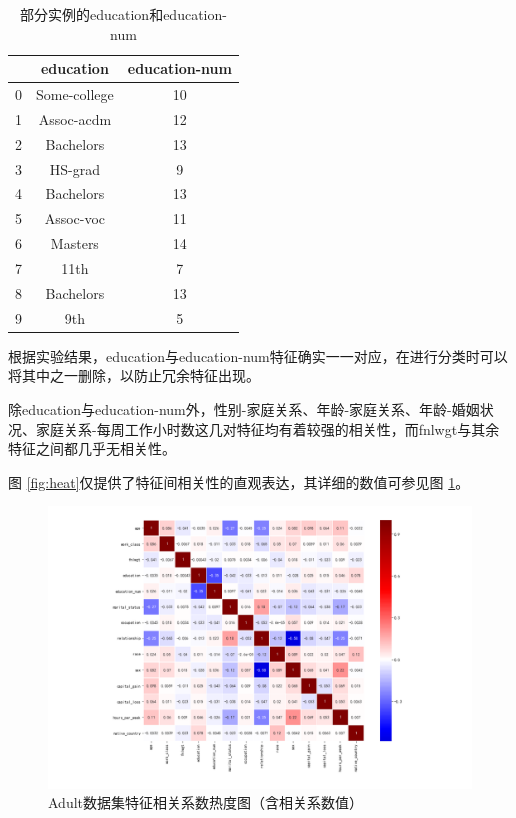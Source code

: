 \documentclass[12pt,a4paper]{article}
\theoremstyle{definition}
\begin{document}
\begin{table}[H]
	\renewcommand\arraystretch{1.35}
	\caption{部分实例的education和education-num}
	\label{tab:guess}
	\centering
	
	\begin{tabular}{c|c|c}
		\centering
		 & education & education-num \\
		\hline
		\hline
		
		0 & Some-college & 10 \\
		1 & Assoc-acdm & 12 \\
		2 & Bachelors & 13 \\
		3 & HS-grad & 9 \\
		4 & Bachelors & 13 \\
		5 & Assoc-voc & 11 \\
		6 & Masters & 14 \\
		7 & 11th & 7 \\
		8 & Bachelors & 13 \\
		9 & 9th & 5 \\

	\end{tabular}
\end{table}

根据实验结果，education与education-num特征确实一一对应，在进行分类时可以将其中之一删除，以防止冗余特征出现。

\vspace{0.01\linewidth}
除education与education-num外，性别-家庭关系、年龄-家庭关系、年龄-婚姻状况、家庭关系-每周工作小时数这几对特征均有着较强的相关性，而fnlwgt与其余特征之间都几乎无相关性。

\vspace{0.01\linewidth}
图 \ref{fig:heat}仅提供了特征间相关性的直观表达，其详细的数值可参见图 \ref{fig:heat2}。

\begin{figure}[H]
	\centering
	\includegraphics[width=0.925\linewidth]{img/cof_heat_anno.png}
	\caption{Adult数据集特征相关系数热度图（含相关系数值）}
	\label{fig:heat2}
\end{figure}
\end{document}

